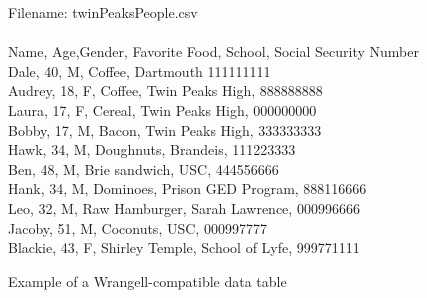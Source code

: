 \documentclass[preprint,nocopyrightspace]{sig-alternate}
\begin{document}
\begin{comment}
TODO: add stuff about doing transformations on data
\end{comment}



\onecolumn

\begin{figure}
\caption{Example of a Wrangell-compatible data table}
Filename: twinPeaksPeople.csv
\\\\
Name,   Age,Gender,	Favorite Food,	School,				Social Security Number \\
Dale,   40,	M,		Coffee,			Dartmouth			111111111\\
Audrey, 18,	F,		Coffee,			Twin Peaks High,	888888888\\
Laura,  17,	F,		Cereal,			Twin Peaks High,	000000000\\
Bobby,  17,	M,		Bacon,			Twin Peaks High,	333333333\\
Hawk,   34,	M,		Doughnuts,		Brandeis,			111223333\\
Ben,    48,	M,		Brie sandwich,	USC,				444556666\\
Hank,   34,	M,		Dominoes,		Prison GED Program,	888116666\\
Leo,    32,	M,		Raw Hamburger,	Sarah Lawrence,		000996666\\
Jacoby,  51, M,		Coconuts,		USC,				000997777\\
Blackie,	43, F,	Shirley Temple,	School of Lyfe,		999771111\\	
\label{exampleTable}	
\end{figure} 
\end{document}
